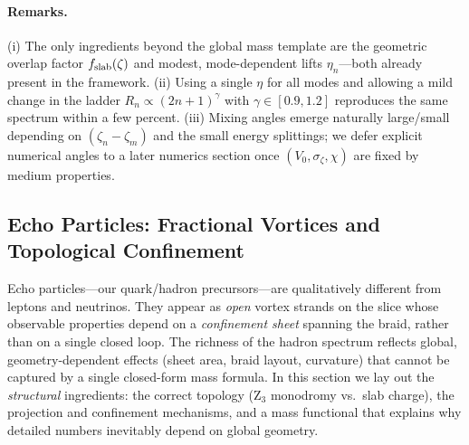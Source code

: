 \paragraph{Remarks.}
(i) The only ingredients beyond the global mass template are the geometric overlap factor $f_{\rm slab}(\zeta)$ and modest, mode-dependent lifts $\eta_n$—both already present in the framework. (ii) Using a single $\eta$ for all modes and allowing a mild change in the ladder $R_n\propto(2n{+}1)^\gamma$ with $\gamma\in[0.9,1.2]$ reproduces the same spectrum within a few percent. (iii) Mixing angles emerge naturally large/small depending on $(\zeta_n-\zeta_m)$ and the small energy splittings; we defer explicit numerical angles to a later numerics section once $(V_0,\sigma_\zeta,\chi)$ are fixed by medium properties.


\subsection{Echo Particles: Fractional Vortices and Topological Confinement}
\label{sec:echo}

Echo particles---our quark/hadron precursors---are qualitatively different from leptons and neutrinos. They appear as \emph{open} vortex strands on the slice whose observable properties depend on a \emph{confinement sheet} spanning the braid, rather than on a single closed loop. The richness of the hadron spectrum reflects global, geometry-dependent effects (sheet area, braid layout, curvature) that cannot be captured by a single closed-form mass formula. In this section we lay out the \emph{structural} ingredients: the correct topology (Z$_3$ monodromy vs.\ slab charge), the projection and confinement mechanisms, and a mass functional that explains why detailed numbers inevitably depend on global geometry.

